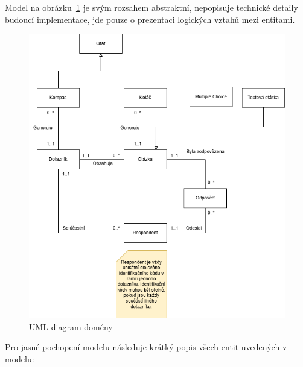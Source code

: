 Model na obrázku~\ref{fig:umldomain} je svým rozsahem abstraktní, nepopisuje technické detaily
budoucí implementace, jde pouze o prezentaci logických vztahů mezi entitami.

\begin{figure}[h!]
    \centering
    \includegraphics[width=\textwidth]{images/domain.drawio.png}
    \caption{UML diagram domény}
    \label{fig:umldomain}
\end{figure}

Pro jasné pochopení modelu následuje krátký popis všech entit uvedených v modelu:

